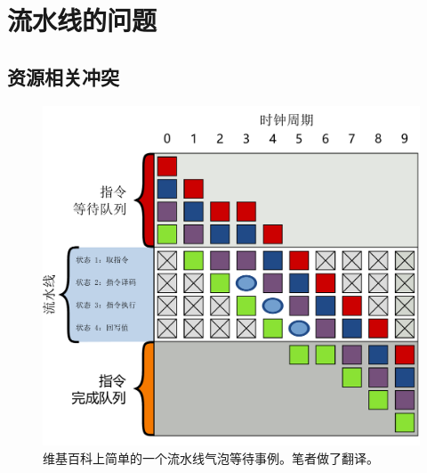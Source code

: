 \documentclass[UTF8,18pt]{ctexart}
\begin{document}
\section{流水线的问题}
\subsection{资源相关冲突}
\begin{figure}
	\centering
	\includegraphics[scale=0.4]{bubble.pdf}
	\caption{ 
		维基百科上简单的一个流水线气泡等待事例。笔者做了翻译。
	}
	\label{fig:bubble}
\end{figure}
\end{document}
